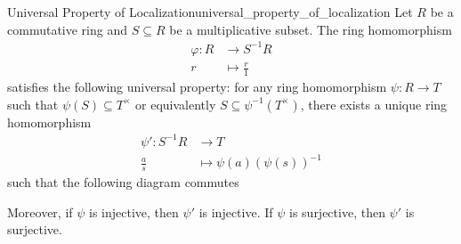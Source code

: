 \begin{proposition}{Universal Property of Localization}{universal_property_of_localization}
    Let $R$ be a commutative ring and $S\subseteq R$ be a multiplicative subset. The ring homomorphism
    \begin{align*}
        \varphi:R&\longrightarrow S^{-1}R\\
         r&\longmapsto \frac{r}{1}
    \end{align*}
    satisfies the following universal property: for any ring homomorphism $\psi:R\to T$ such that $\psi(S)\subseteq T^\times$ or equivalently $S\subseteq \psi^{-1}(T^\times)$, there exists a unique ring homomorphism 
    \begin{align*}
        \psi':S^{-1}R&\longrightarrow T\\
        \frac{a}{s}&\longmapsto \psi(a)(\psi(s))^{-1}
    \end{align*}
    such that the following diagram commutes
    \begin{center}
    \end{center}
    Moreover, if $\psi$ is injective, then $\psi'$ is injective. If $\psi$ is surjective, then $\psi'$ is surjective.
\end{proposition}

